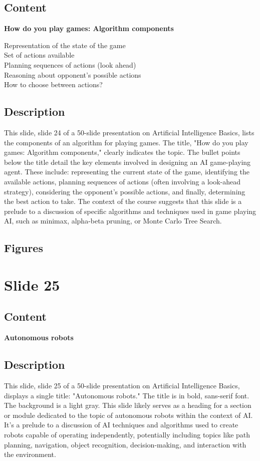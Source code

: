 \documentclass{article}%
\begin{document}
\subsection{Content}%

\textbf{How do you play games: Algorithm components}

Representation of the state of the game \\
Set of actions available \\
Planning sequences of actions (look ahead) \\
Reasoning about opponent's possible actions \\
How to choose between actions?
%
\subsection{Description}%
This slide, slide 24 of a 50-slide presentation on Artificial Intelligence Basics, lists the components of an algorithm for playing games.  The title, "How do you play games: Algorithm components," clearly indicates the topic.  The bullet points below the title detail the key elements involved in designing an AI game-playing agent.  These include: representing the current state of the game, identifying the available actions, planning sequences of actions (often involving a look-ahead strategy), considering the opponent's possible actions, and finally, determining the best action to take.  The context of the course suggests that this slide is a prelude to a discussion of specific algorithms and techniques used in game playing AI, such as minimax, alpha-beta pruning, or Monte Carlo Tree Search.%
\subsection{Figures}%
\begin{figure}[H]%
\centering%
\end{figure}

%
\newpage%
\section{Slide 25}%
\label{sec:Slide25}%
\subsection{Content}%

\textbf{Autonomous robots}
%
\subsection{Description}%
This slide, slide 25 of a 50-slide presentation on Artificial Intelligence Basics, displays a single title: "Autonomous robots."  The title is in bold, sans-serif font. The background is a light gray.  This slide likely serves as a heading for a section or module dedicated to the topic of autonomous robots within the context of AI.  It's a prelude to a discussion of AI techniques and algorithms used to create robots capable of operating independently, potentially including topics like path planning, navigation, object recognition, decision-making, and interaction with the environment.%
\end{document}
